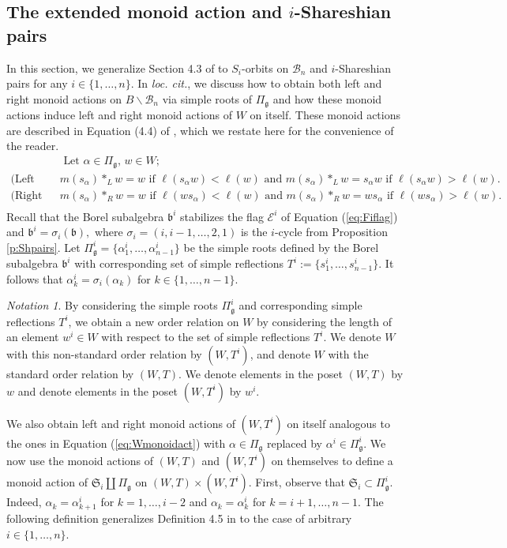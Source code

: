 \documentclass[12pt]{amsart}
\numberwithin{equation}{section}
\theoremstyle{remark}
\newtheorem{nota}[thm]{Notation}
\theoremstyle{definition}
\newcommand{\fg}{\mbox{${\mathfrak g}$}}
\newcommand{\fb}{\mbox{${\mathfrak b}$}}
\newcommand{\B}{\mathcal{B}}
\begin{document}
\subsection{The extended monoid action and $i$-Shareshian pairs}
In this section, we generalize Section 4.3 of \cite{Shpairs} to $S_{i}$-orbits on $\B_{n}$ and $i$-Shareshian pairs for any $i\in\{1,\dots, n\}$.  In \emph{loc. cit.}, we discuss how to obtain both left and right monoid actions on $B\backslash\B_{n}$ via simple roots of $\Pi_{\fg}$ and how these monoid actions induce left and right monoid actions of $W$ on itself.  These monoid actions are described in Equation (4.4) of \cite{Shpairs}, which we restate here for the convenience of the reader.
\begin{equation}\label{eq:Wmonoidact}
\begin{split}
&\mbox{ Let } \alpha\in\Pi_{\fg},\, w\in W;\\
\mbox{(Left Action) } &m(s_{\alpha})*_{L} w=w \mbox{ if } \ell(s_{\alpha}w)<\ell(w) \mbox{ and } m(s_{\alpha})*_{L}w=s_{\alpha}w\mbox{ if } \ell(s_{\alpha}w)>\ell(w).\\
\mbox{(Right Action) } &m(s_{\alpha})*_{R}w=w \mbox{ if } \ell(ws_{\alpha})<\ell(w) \mbox{ and } m(s_{\alpha})*_{R}w=ws_{\alpha}\mbox{ if } \ell(ws_{\alpha})>\ell(w).\\
\end{split}
\end{equation}
Recall that the Borel subalgebra $\fb^{i}$ stabilizes the flag $\mathcal{E}^{i}$ of Equation (\ref{eq:Fiflag}) and $\fb^{i}=\sigma_{i}(\fb),$ where $\sigma_{i}=(i,i-1,\dots, 2, 1)$ is the $i$-cycle from Proposition \ref{p:Shpairs}.   Let $\Pi^{i}_{\fg}=\{\alpha_{1}^{i},\dots, \alpha_{n-1}^{i}\}$ be the simple roots defined by the Borel subalgebra $\fb^{i}$ with corresponding set of simple reflections $T^{i}:=\{s^{i}_{1},\dots, s^{i}_{n-1}\}$.  It follows that $\alpha^{i}_{k}=\sigma_{i}(\alpha_{k})$ for $k\in \{1,\dots, n-1\}$.
\begin{nota}\label{n:Worders}
By considering the simple roots $\Pi_{\fg}^{i}$ and corresponding simple reflections $T^{i}$, we obtain a new order relation on $W$ by considering the length of an element $w^{i}\in W$ with respect to the set of simple reflections $T^{i}$.  We denote $W$ with this non-standard order relation by $(W, T^{i})$, and denote $W$ with the standard order relation by $(W,T)$.  We denote elements in the poset $(W,T)$ by $w$ and denote elements in the poset $(W, T^{i})$ by $w^{i}$.
\end{nota}
We also obtain left and right monoid actions of $(W,T^{i})$ on itself analogous to the ones in Equation (\ref{eq:Wmonoidact}) with $\alpha\in\Pi_{\fg}$ replaced by $\alpha^{i}\in \Pi_{\fg}^{i}$.  We now use the monoid actions of $(W,T)$ and $(W,T^{i})$ on themselves to define a monoid action of $\mathfrak{S}_i\coprod\Pi_{\fg}$ on $(W,T)\times (W,T^{i})$.  First, observe that $\mathfrak{S}_i\subset\Pi_{\fg}^{i}$.  Indeed, $\alpha_{k}=\alpha_{k+1}^{i}$ for $k=1,\dots, i-2$ and $\alpha_{k}=\alpha_{k}^{i}$ for $k=i+1,\dots, n-1$.   The following definition generalizes Definition 4.5 in \cite{Shpairs} to the case of arbitrary $i\in\{1,\dots, n\}$.  
\end{document}
